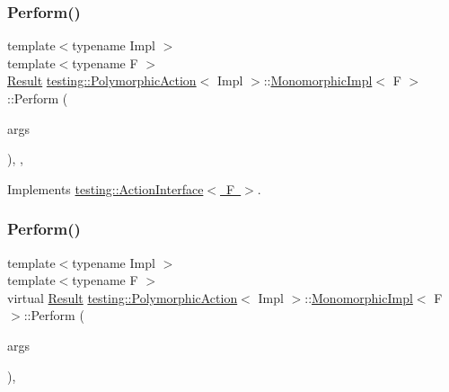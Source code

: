 \subsubsection{\texorpdfstring{Perform()}{Perform()}\hspace{0.1cm}{\footnotesize\ttfamily [2/3]}}
{\footnotesize\ttfamily template$<$typename Impl $>$ \\
template$<$typename F $>$ \\
\mbox{\hyperlink{classtesting_1_1_action_interface_a7477de2fe3e4e01c59db698203acaee7}{Result}} \mbox{\hyperlink{classtesting_1_1_polymorphic_action}{testing\+::\+Polymorphic\+Action}}$<$ Impl $>$\+::\mbox{\hyperlink{classtesting_1_1_polymorphic_action_1_1_monomorphic_impl}{Monomorphic\+Impl}}$<$ F $>$\+::Perform (\begin{DoxyParamCaption}\item[{const \mbox{\hyperlink{classtesting_1_1_action_interface_af72720d864da4d606629e83edc003511}{Argument\+Tuple}} \&}]{args }\end{DoxyParamCaption})\hspace{0.3cm}{\ttfamily [inline]}, {\ttfamily [override]}, {\ttfamily [virtual]}}



Implements \mbox{\hyperlink{classtesting_1_1_action_interface_a20f8624fcea1786f2992b358760422a0}{testing\+::\+Action\+Interface$<$ F $>$}}.

\mbox{\label{classtesting_1_1_polymorphic_action_1_1_monomorphic_impl_af657293ae1ac638802c0fd2486ee5f5b}} 
\subsubsection{\texorpdfstring{Perform()}{Perform()}\hspace{0.1cm}{\footnotesize\ttfamily [3/3]}}
{\footnotesize\ttfamily template$<$typename Impl $>$ \\
template$<$typename F $>$ \\
virtual \mbox{\hyperlink{classtesting_1_1_action_interface_a7477de2fe3e4e01c59db698203acaee7}{Result}} \mbox{\hyperlink{classtesting_1_1_polymorphic_action}{testing\+::\+Polymorphic\+Action}}$<$ Impl $>$\+::\mbox{\hyperlink{classtesting_1_1_polymorphic_action_1_1_monomorphic_impl}{Monomorphic\+Impl}}$<$ F $>$\+::Perform (\begin{DoxyParamCaption}\item[{const \mbox{\hyperlink{classtesting_1_1_action_interface_af72720d864da4d606629e83edc003511}{Argument\+Tuple}} \&}]{args }\end{DoxyParamCaption})\hspace{0.3cm}{\ttfamily [inline]}, {\ttfamily [virtual]}}



